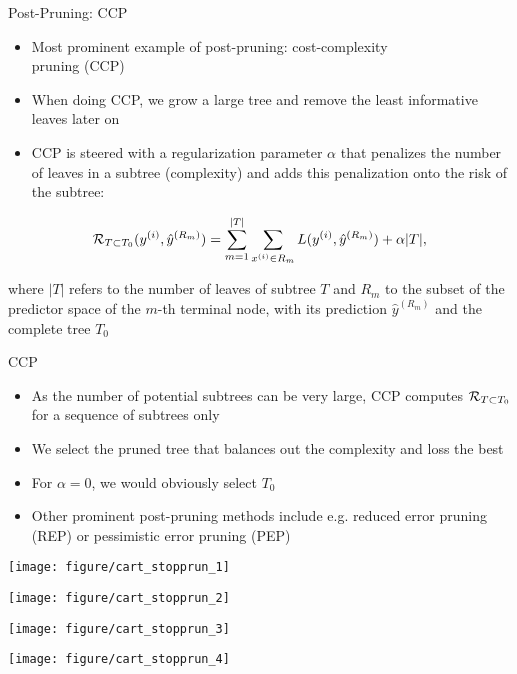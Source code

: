 \documentclass[11pt,compress,t,notes=noshow, xcolor=table]{beamer}
\begin{document}
\begin{vbframe}{Post-Pruning: CCP}
\begin{itemize}
\item Most prominent example of post-pruning: cost-complexity \\ pruning (CCP)
\item When doing CCP, we grow a large tree and remove the least informative leaves later on
\item CCP is steered with a regularization parameter $\alpha$ that penalizes the number of leaves in a subtree (complexity) and adds this penalization onto the risk of the subtree:
\end{itemize}

$$\mathcal{R}_{T \subset T_0}(y^{(i)}, \hat{y}^{(R_m)}) = \sum_{m=1}^{|T|} \sum_{x^{(i)} \in R_m} L(y^{(i)}, \hat{y}^{(R_m)}) + \alpha |T|,$$

where $|T|$ refers to the number of leaves of subtree $T$ and $R_m$ to the subset of the predictor space of the $m$-th terminal node, with its prediction $\hat{y}^{(R_m)}$ and the complete tree $T_0$

\end{vbframe}

\begin{vbframe}{CCP}

\begin{itemize}
\item As the number of potential subtrees can be very large, CCP computes $\mathcal{R}_{T \subset T_0}$ for a sequence of subtrees only
\item We select the pruned tree that balances out the complexity and loss the best
\item For $\alpha = 0$, we would obviously select $T_0$
\item Other prominent post-pruning methods include e.g. reduced error pruning (REP) or pessimistic error pruning (PEP)
\end{itemize}

\framebreak

\begin{knitrout}\scriptsize
{}\color{fgcolor}

{\centering \texttt{[image: figure/cart\_stopprun\_1]} 

}




{\centering \texttt{[image: figure/cart\_stopprun\_2]} 

}




{\centering \texttt{[image: figure/cart\_stopprun\_3]} 

}




{\centering \texttt{[image: figure/cart\_stopprun\_4]} 

}



\end{knitrout}
\end{vbframe}



\endlecture
\end{document}
